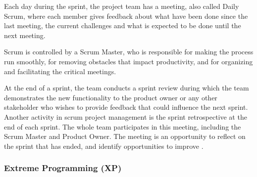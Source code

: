 Each day during the sprint, the project team has a meeting, also called Daily Scrum, where each member gives feedback about what have been done since the last meeting, the current challenges and what is expected to be done until the next meeting.

Scrum is controlled by a Scrum Master, who is responsible for making the process run smoothly, for removing obstacles that impact productivity, and for organizing and facilitating the critical meetings. 

At the end of a sprint, the team conducts a sprint review during which the team demonstrates the new functionality to the product owner or any other stakeholder who wishes to provide feedback that could influence the next sprint.
Another activity in scrum project management is the sprint retrospective at the end of each sprint. The whole team participates in this meeting, including the Scrum Master and Product Owner. The meeting is an opportunity to reflect on the sprint that has ended, and identify opportunities to improve \cite{agile:scrum}.

\subsubsection{Extreme Programming (XP)}

